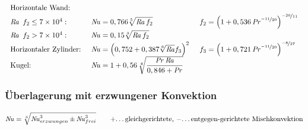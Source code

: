 	\setlength{\abovedisplayskip}{-15pt}
	\[ \arraycolsep=0.7em  \def\arraystretch{1.4}
	\begin{array}{lll}
		\text{Horizontale Wand:} &&\\
		 \Rayl\ f_2 \leq \num{7e4}: & \Nuss = 0,766 \displaystyle\sqrt[5]{\Rayl f_2} & f_2 = \left( 1+ 0,536 \Pran ^{\nicefrac{-11}{20}} \right) ^{\nicefrac{-20}{11}} \\
		 \Rayl\ f_2 > \num{7e4}: & \Nuss = 0,15 \displaystyle\sqrt[3]{\Rayl f_2} &\\
		 \text{Horizontaler Zylinder:} & \Nuss = \left(0,752 + 0,387 \sqrt[6]{\Rayl} f_3 \right)^2 & f_3 = \left( 1 + 0,721\Pran^{\nicefrac{-11}{20}}\right) ^{\nicefrac{-8}{27}} \\
		 \text{Kugel:} & \Nuss = 1 + 0,56\, \sqrt[4]{\dfrac{\Pran\Rayl}{0,846 + \Pran}}
	\end{array}\]

\subsubsection{Überlagerung mit erzwungener Konvektion}
	\[ \operatorname{\mathit{N\kern-.20em u}} = \sqrt[3]{\operatorname{\mathit{N\kern-.20em u}}_{erzwungen}^3 \pm \operatorname{\mathit{N\kern-.20em u}}_{frei}^3} \qquad \text{+\dots gleichgerichtete, $-$\dots entgegen-gerichtete Mischkonvektion}\]

